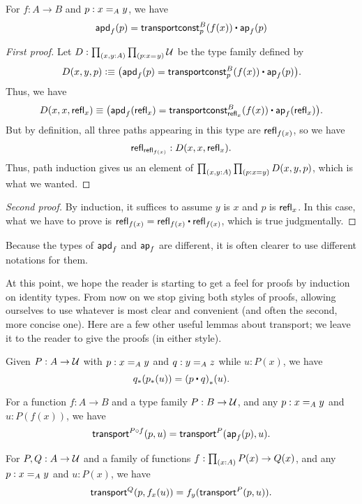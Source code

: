 \begin{lem}\label{thm:apd-const}
  For $f:A\to B$ and $p:\id[A]xy$, we have
  \[ \apdfunc f(p) = \transconst B p{f(x)} \ct \apfunc f (p) \]
\end{lem}
\begin{proof}[First proof]
  Let $D:\prd{x,y:A}{p:\id xy} \type$ be the type family defined by
  \[ D(x,y,p) \defeq \big(\apdfunc f (p) = \transconst Bp{f(x)} \ct \apfunc f (p)\big). \]
  Thus, we have
  \[D(x,x,\refl x) \jdeq \big(\apdfunc f (\refl x) = \transconst B{\refl x}{f(x)} \ct \apfunc f ({\refl x})\big).\]
  But by definition, all three paths appearing in this type are $\refl{f(x)}$, so we have
  \[ \refl{\refl{f(x)}} : D(x,x,\refl x). \]
  Thus, path induction gives us an element of $\prd{x,y:A}{p:x=y} D(x,y,p)$, which is what we wanted.
\end{proof}
\begin{proof}[Second proof]
  By induction, it suffices to assume $y$ is $x$ and $p$ is $\refl x$.
  In this case, what we have to prove is $\refl{f(x)} = \refl{f(x)} \ct \refl{f(x)}$, which is true judgmentally.
\end{proof}

Because the types of $\apdfunc{f}$ and $\apfunc{f}$ are different, it is often clearer to use different notations for them.

At this point, we hope the reader is starting to get a feel for proofs by induction on identity types.
From now on we stop giving both styles of proofs, allowing ourselves to use whatever is most clear and convenient (and often the second, more concise one).
Here are a few other useful lemmas about transport; we leave it to the reader to give the proofs (in either style).

\begin{lem}\label{thm:transport-concat}
  Given $P:A\to\type$ with $p:\id[A]xy$ and $q:\id[A]yz$ while $u:P(x)$, we have
  \[ \trans{q}{\trans{p}{u}} = \trans{(p\ct q)}{u}. \]
\end{lem}

\begin{lem}\label{thm:transport-compose}
  For a function $f:A\to B$ and a type family $P:B\to\type$, and any $p:\id[A]xy$ and $u:P(f(x))$, we have
  \[ \transfib{P\circ f}{p}{u} = \transfib{P}{\apfunc f(p)}{u}. \]
\end{lem}

\begin{lem}\label{thm:ap-transport}
  For $P,Q:A\to \type$ and a family of functions $f:\prd{x:A} P(x)\to Q(x)$, and any $p:\id[A]xy$ and $u:P(x)$, we have
  \[ \transfib{Q}{p}{f_x(u)} = f_y(\transfib{P}{p}{u}). \]
\end{lem}


